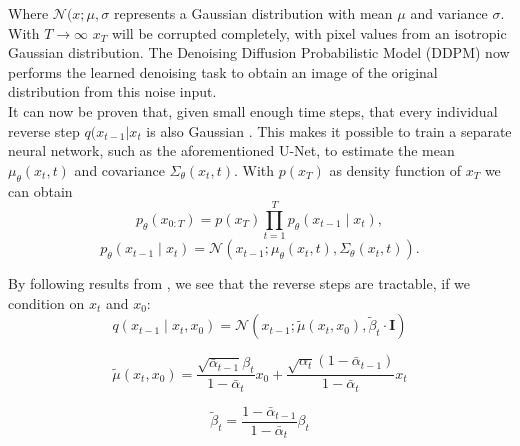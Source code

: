 \documentclass{article}
\begin{document}
Where $\mathcal{N}(x;\mu,\sigma$ represents a Gaussian distribution with mean $\mu$ and variance $\sigma$. With $T \longrightarrow \infty$ $x_T$ will be corrupted completely, with pixel values from an isotropic Gaussian distribution. The Denoising Diffusion Probabilistic Model (DDPM) now performs the learned denoising task to obtain an image of the original distribution from this noise input. \\
It can now be proven that, given small enough time steps, that every individual reverse step $q(x_{t-1}|x_t$ is also Gaussian \cite{sohldickstein2015deep}. This makes it possible to train a separate neural network, such as the aforementioned U-Net, to estimate the mean $\mu_\theta(x_t, t)$ and covariance $\Sigma_\theta(x_t, t)$. With $p(x_T)$ as density function of $x_T$ we can obtain
\begin{equation}
    p_\theta\left(x_{0: T}\right)=p\left(x_T\right) \prod_{t=1}^T p_\theta\left(x_{t-1} \mid x_t\right),
\end{equation}
\begin{equation}
    p_\theta\left(x_{t-1} \mid x_t\right)=\mathcal{N}\left(x_{t-1} ; \mu_\theta\left(x_t, t\right), \Sigma_\theta\left(x_t, t\right)\right).
\end{equation}

By following results from \cite{ho2020denoising}, we see that the reverse steps are tractable, if we condition on $x_t$ and $x_0$:
\begin{equation}
q\left(x_{t-1} \mid x_t, x_0\right)=\mathcal{N}\left(x_{t-1} ; \tilde{\mu}\left(x_t, x_0\right), \tilde{\beta}_t \cdot \mathbf{I}\right)
\end{equation}

\begin{equation}\label{eq7}
    \tilde{\mu}\left(x_t, x_0\right)=\frac{\sqrt{\bar{\alpha}_{t-1}} \beta_t}{1-\bar{\alpha}_t} x_0+\frac{\sqrt{\alpha_t}\left(1-\bar{\alpha}_{t-1}\right)}{1-\bar{\alpha}_t} x_t
\end{equation}

\begin{equation}
    \tilde{\beta}_t=\frac{1-\bar{\alpha}_{t-1}}{1-\bar{\alpha}_t} \beta_t
\end{equation}
\end{document}
